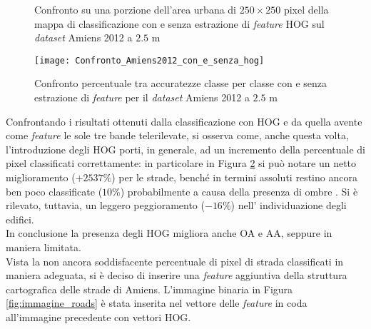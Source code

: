  \begin{figure}[!ht]

\center


 \hspace{3mm}

  \caption{Confronto su una porzione dell'area urbana di
$250\times250$ pixel della mappa di classificazione con e senza
estrazione di \emph{feature} HOG sul \emph{dataset} Amiens 2012 a
$2.5$ m }
 \label{fig:confrontoAmiens2012_2_5m}
\end{figure}

\begin{figure}[!ht]

\texttt{[image: Confronto\_Amiens2012\_con\_e\_senza\_hog]}

\caption{Confronto percentuale tra accuratezze classe per classe con e
senza estrazione di \emph{feature} per il \emph{dataset} Amiens 2012 a
$2.5$ m}

\label{fig:Confronto_Amiens2012_2.5m}

\end{figure}

Confrontando i risultati ottenuti dalla classificazione con HOG e da
quella avente come \emph{feature} le sole tre bande telerilevate, si
osserva come, anche questa volta, l'introduzione degli HOG porti, in
generale, ad un incremento della percentuale di pixel classificati
correttamente: in particolare in Figura
\ref{fig:Confronto_Amiens2012_2.5m} si può notare un netto
miglioramento ($+2537\%$) per le strade, benché in termini assoluti
restino ancora ben poco classificate ($10\%$) probabilmente a causa
della presenza di ombre . Si è rilevato, tuttavia, un leggero
peggioramento ($-16\%$) nell' individuazione degli edifici. \\ In
conclusione la presenza degli HOG migliora anche OA e AA, seppure in
maniera limitata. \\

Vista la non ancora soddisfacente percentuale di pixel di strada
classificati in maniera adeguata, si è deciso di inserire una
\emph{feature} aggiuntiva della struttura cartografica delle strade di
Amiens. L'immagine binaria in Figura \ref{fig:immagine_roads} è stata
inserita nel vettore delle \emph{feature} in coda all'immagine
precedente con vettori HOG.

